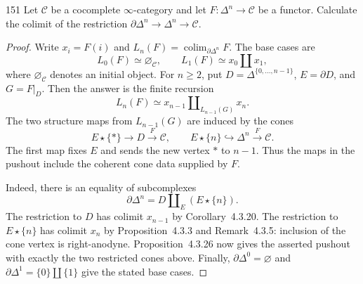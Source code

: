 \begin{exercise}{151}
Let $\mathcal{C}$ be a cocomplete $\infty$-category and let $F\colon\Delta^n\to\mathcal{C}$ be a functor. Calculate
the colimit of the restriction $\partial\Delta^n\to\Delta^n\to\mathcal{C}$.

\begin{proof}
Write $x_i=F(i)$ and
$L_n(F)=\operatorname*{colim}_{\partial\Delta^n}F$.
The base cases are
\[
 L_0(F)\simeq\varnothing_{\mathcal{C}},\qquad
 L_1(F)\simeq x_0\amalg x_1,
\]
where $\varnothing_{\mathcal{C}}$ denotes an initial object.
For $n\ge2$, put
$D=\Delta^{\{0,\ldots,n-1\}}$, $E=\partial D$, and $G=F|_D$.
Then the answer is the finite recursion
\[
 L_n(F)\simeq x_{n-1}\amalg_{L_{n-1}(G)}x_n.
\]
The two structure maps from $L_{n-1}(G)$ are induced by the cones
\[
 E\star\{*\}\longrightarrow D\xrightarrow{\ F\ }\mathcal{C},
 \qquad
 E\star\{n\}\hookrightarrow\Delta^n\xrightarrow{\ F\ }\mathcal{C}.
\]
The first map fixes $E$ and sends the new vertex $*$ to $n-1$.
Thus the maps in the pushout include the coherent cone data supplied
by $F$.

Indeed, there is an equality of subcomplexes
\[
 \partial\Delta^n=D\amalg_E(E\star\{n\}).
\]
The restriction to $D$ has colimit $x_{n-1}$ by
Corollary~4.3.20.
The restriction to $E\star\{n\}$ has colimit $x_n$ by
Proposition~4.3.3 and Remark~4.3.5: inclusion of the cone vertex
is right-anodyne.
Proposition~4.3.26 now gives the asserted pushout with exactly the
two restricted cones above.
Finally, $\partial\Delta^0=\varnothing$ and
$\partial\Delta^1=\{0\}\amalg\{1\}$ give the stated base cases.
\end{proof}
\end{exercise}

